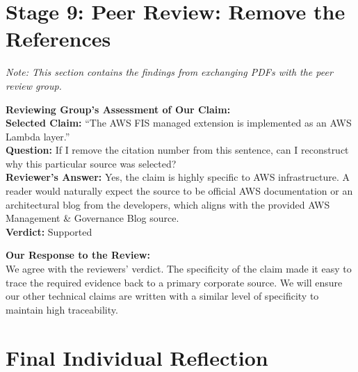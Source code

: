 \documentclass{article}
\begin{document}


\section*{Stage 9: Peer Review: Remove the References}

\textit{Note: This section contains the findings from exchanging PDFs with the peer review group.}

\vspace{0.5em}
\noindent\textbf{Reviewing Group's Assessment of Our Claim:} \\
\textbf{Selected Claim:} ``The AWS FIS managed extension is implemented as an AWS Lambda layer.'' \\
\textbf{Question:} If I remove the citation number from this sentence, can I reconstruct why this particular source was selected? \\
\textbf{Reviewer's Answer:} Yes, the claim is highly specific to AWS infrastructure. A reader would naturally expect the source to be official AWS documentation or an architectural blog from the developers, which aligns with the provided AWS Management \& Governance Blog source. \\
\textbf{Verdict:} Supported

\vspace{0.5em}
\noindent\textbf{Our Response to the Review:} \\
We agree with the reviewers' verdict. The specificity of the claim made it easy to trace the required evidence back to a primary corporate source. We will ensure our other technical claims are written with a similar level of specificity to maintain high traceability.


\newpage
\section*{Final Individual Reflection}
\end{document}
